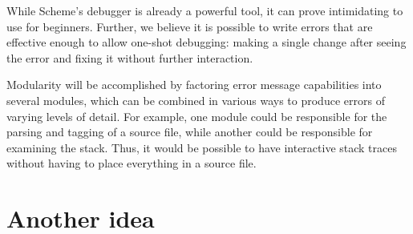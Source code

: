 \documentclass{scrartcl}
\begin{document}
While Scheme's debugger is already a powerful tool, it can prove intimidating
to use for beginners. Further, we believe it is possible to write errors that
are effective enough to allow one-shot debugging: making a single change after
seeing the error and fixing it without further interaction.

Modularity will be accomplished by factoring error message capabilities into
several modules, which can be combined in various ways to produce errors of
varying levels of detail. For example, one module could be responsible for the
parsing and tagging of a source file, while another could be responsible for
examining the stack. Thus, it would be possible to have interactive stack
traces without having to place everything in a source file.



\section{Another idea}
\end{document}
